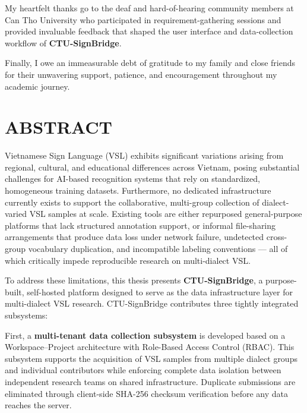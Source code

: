 My heartfelt thanks go to the deaf and hard-of-hearing community members at Can Tho University who participated in requirement-gathering sessions and provided invaluable feedback that shaped the user interface and data-collection workflow of \textbf{CTU-SignBridge}.

Finally, I owe an immeasurable debt of gratitude to my family and close friends for their unwavering support, patience, and encouragement throughout my academic journey.

\vspace{1cm}
\begin{flushright}
    \textbf{\StudentName}
\end{flushright}

\newpage
\chapter*{ABSTRACT}

Vietnamese Sign Language (VSL) exhibits significant variations arising from regional, cultural, and educational differences across Vietnam, posing substantial challenges for AI-based recognition systems that rely on standardized, homogeneous training datasets. Furthermore, no dedicated infrastructure currently exists to support the collaborative, multi-group collection of dialect-varied VSL samples at scale. Existing tools are either repurposed general-purpose platforms that lack structured annotation support, or informal file-sharing arrangements that produce data loss under network failure, undetected cross-group vocabulary duplication, and incompatible labeling conventions --- all of which critically impede reproducible research on multi-dialect VSL.

To address these limitations, this thesis presents \textbf{CTU-SignBridge}, a purpose-built, self-hosted platform designed to serve as the data infrastructure layer for multi-dialect VSL research. CTU-SignBridge contributes three tightly integrated subsystems:

First, a \textbf{multi-tenant data collection subsystem} is developed based on a Workspace--Project architecture with Role-Based Access Control (RBAC). This subsystem supports the acquisition of VSL samples from multiple dialect groups and individual contributors while enforcing complete data isolation between independent research teams on shared infrastructure. Duplicate submissions are eliminated through client-side SHA-256 checksum verification before any data reaches the server.

